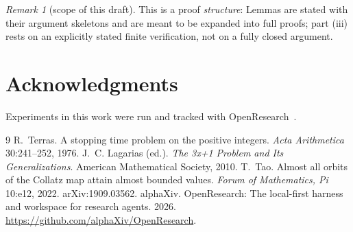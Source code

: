 \documentclass[11pt]{article}
\theoremstyle{remark}
\newtheorem{remark}[theorem]{Remark}
\begin{document}
\begin{remark}[scope of this draft]
This is a proof \emph{structure}: Lemmas are stated with their argument
skeletons and are meant to be expanded into full proofs; part (iii) rests on
an explicitly stated finite verification, not on a fully closed argument.
\end{remark}

\section*{Acknowledgments}
Experiments in this work were run and tracked with OpenResearch~\citep{openresearch}.

\begin{thebibliography}{9}
 R.~Terras. A stopping time problem on the
  positive integers. \emph{Acta Arithmetica} 30:241--252, 1976.
 J.~C. Lagarias (ed.). \emph{The
  3x+1 Problem and Its Generalizations}. American Mathematical Society,
  2010.
 T.~Tao. Almost all orbits of the Collatz map
  attain almost bounded values. \emph{Forum of Mathematics, Pi} 10:e12,
  2022. arXiv:1909.03562.
 alphaXiv. OpenResearch: The
  local-first harness and workspace for research agents. 2026.
  \url{https://github.com/alphaXiv/OpenResearch}.
\end{thebibliography}
\end{document}
